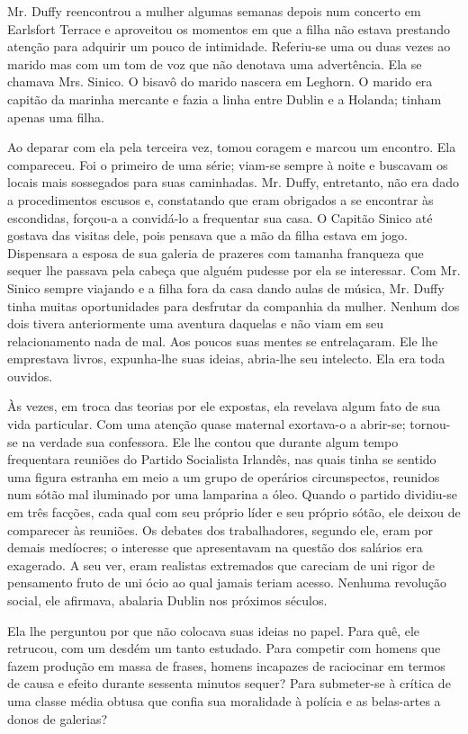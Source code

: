 Mr. Duffy reencontrou a mulher algumas semanas depois num concerto em
Earlsfort Terrace e aproveitou os momentos em que
a filha não estava prestando atenção para adquirir um pouco de
intimidade. Referiu-se uma ou duas vezes ao marido mas com um tom de
voz que não denotava uma advertência. Ela se chamava Mrs. Sinico. O
bisavô do marido nascera em Leghorn. O marido era capitão da marinha
mercante e fazia a linha entre Dublin e a Holanda; tinham apenas uma
filha.

Ao deparar com ela pela terceira vez, tomou coragem e marcou um
encontro. Ela compareceu. Foi o primeiro de uma série; viam-se sempre
à noite e buscavam os locais mais sossegados para suas caminhadas. Mr.
Duffy, entretanto, não era dado a procedimentos escusos e,
constatando que eram obrigados a se encontrar às escondidas, forçou-a
a convidá-lo a frequentar sua casa. O Capitão Sinico até gostava das
visitas dele, pois pensava que a mão da filha estava em jogo.
Dispensara a esposa de sua galeria de prazeres com tamanha franqueza
que sequer lhe passava pela cabeça que alguém pudesse por ela se
interessar. Com Mr. Sinico sempre viajando e a filha fora da casa
dando aulas de música, Mr. Duffy tinha muitas oportunidades para
desfrutar da companhia da mulher. Nenhum dos dois tivera
anteriormente uma aventura daquelas e não viam em seu relacionamento
nada de mal. Aos poucos suas mentes se entrelaçaram. Ele lhe
emprestava livros, expunha-lhe suas ideias, abria-lhe seu intelecto.
Ela era toda ouvidos.

Às vezes, em troca das teorias por ele expostas, ela revelava algum
fato de sua vida particular. Com uma atenção quase maternal
exortava-o a abrir-se; tornou-se na verdade sua confessora. Ele lhe
contou que durante algum tempo frequentara reuniões do Partido
Socialista Irlandês, nas quais tinha se sentido uma figura estranha
em meio a um grupo de operários circunspectos, reunidos num sótão
mal iluminado por uma lamparina a óleo. Quando o partido dividiu-se em
três facções, cada qual com seu próprio líder e seu próprio sótão, ele
deixou de comparecer às reuniões. Os debates dos trabalhadores,
segundo ele, eram por demais medíocres; o interesse que apresentavam
na questão dos salários era exagerado. A seu ver, eram realistas
extremados que careciam de uni rigor de pensamento fruto de uni ócio
ao qual jamais teriam
acesso. Nenhuma revolução social, ele afirmava, abalaria Dublin nos
próximos séculos.

Ela lhe perguntou por que não colocava suas ideias no papel. Para quê,
ele retrucou, com um desdém um tanto estudado. Para competir com
homens que fazem produção em massa de frases, homens incapazes de
raciocinar em termos de causa e efeito durante sessenta minutos
sequer? Para submeter-se à crítica de uma classe média obtusa que
confia sua moralidade à polícia e as belas-artes a donos de galerias?

